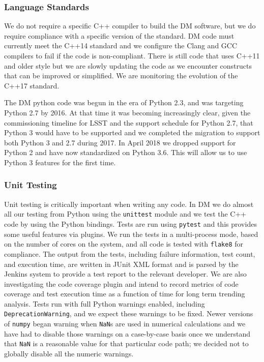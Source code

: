 \subsubsection{Language Standards}

We do not require a specific C++ compiler to build the DM software, but we do require compliance with a specific version of the standard.
DM code must currently meet the C++14 standard and we configure the Clang and GCC compilers to fail if the code is non-compliant.
There is still code that uses C++11 and older style but we are slowly updating the code as we encounter constructs that can be improved or simplified.
We are monitoring the evolution of the C++17 standard.

The DM python code was begun in the era of Python 2.3, and was targeting Python 2.7 by 2016.
At that time it was becoming increasingly clear, given the commissioning timeline for LSST and the support schedule for Python 2.7, that Python 3 would have to be supported and we completed the migration to support both Python 3 and 2.7 during 2017\cite{2016arXiv161100751J}.
In April 2018 we dropped support for Python 2 and have now standardized on Python 3.6\cite{2017arXiv171200461J}.
This will allow us to use Python 3 features for the first time.

\subsubsection{Unit Testing}

Unit testing is critically important when writing any code.
In DM we do almost all our testing from Python using the \texttt{unittest} module and we test the C++ code by using the Python bindings.
Tests are run using \texttt{pytest}\cite{pytest} and this provides some useful features via plugins.
We run the tests in a multi-process mode, based on the number of cores on the system, and all code is tested with \texttt{flake8} for compliance.
The output from the tests, including failure information, test count, and execution time, are written in JUnit XML format and is parsed by the Jenkins system to provide a test report to the relevant developer.
We are also investigating the code coverage plugin and intend to record metrics of code coverage and test execution time as a function of time for long term trending analysis.
Tests run with full Python warnings enabled, including \texttt{DeprecationWarning}, and we expect these warnings to be fixed.
Newer versions of \texttt{numpy} began warning when \texttt{NaN}s are used in numerical calculations and we have had to disable those warnings on a case-by-case basis once we understand that \texttt{NaN} is a reasonable value for that particular code path; we decided not to globally disable all the numeric warnings.

